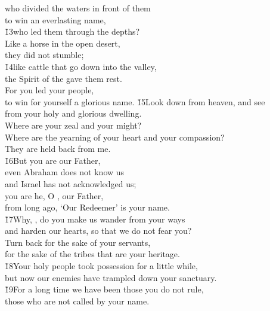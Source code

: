 \begin{poetry}
\poeml who divided the waters in front of them \\
\poemll    to win an everlasting name, \\
\poeml \v{13}who led them through the depths? \\
\poemll    Like a horse in the open desert, \\
\poemlll       they did not stumble; \\
\poeml \v{14}like cattle that go down into the valley, \\
\poemll    the Spirit of the  gave them rest. \\
\poeml For you led your people, \\
\poemll    to win for yourself a glorious name.
\poeml \v{15}Look down from heaven, and see \\
\poemll    from your holy and glorious dwelling. \\
\poeml Where are your zeal and your might? \\
\poemll    Where are the yearning of your heart and your compassion? \\
\poemlll       They are held back from me. \\
\poeml \v{16}But you are our Father, \\
\poemll    even Abraham does not know us \\
\poemlll       and Israel has not acknowledged us; \\
\poeml you are he, O , our Father, \\
\poemll    from long ago, `Our Redeemer' is your name. \\
\poeml \v{17}Why, , do you make us wander from your ways \\
\poemll    and harden our hearts, so that we do not fear you? \\
\poeml Turn back for the sake of your servants, \\
\poemll    for the sake of the tribes that are your heritage. \\
\poeml \v{18}Your holy people took possession for a little while, \\
\poemll    but now our enemies have trampled down your sanctuary. \\
\poeml \v{19}For a long time we have been those you do not rule, \\
\poemll    those who are not called by your name.
\end{poetry}


